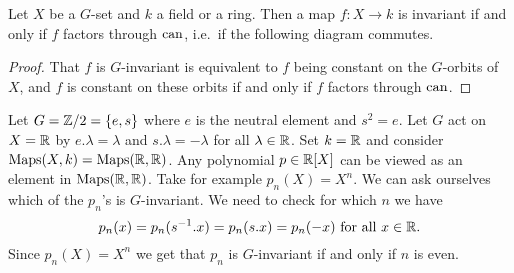 \begin{lem}
 Let $X$ be a $G$-set and $k$ a field or a ring. Then a map $f \colon X \to k$ is invariant if and only if $f$ factors through $\operatorname{can}$, i.e.\ if the following diagram commutes.
 \begin{center}
 \end{center}
\end{lem}
\begin{proof}
 That $f$ is $G$-invariant is equivalent to $f$ being constant on the $G$-orbits of $X$, and $f$ is constant on these orbits if and only if $f$ factors through $\operatorname{can}$.
\end{proof}


\begin{expl}
 Let $G = \mathbb{Z}/2 = \{e,s\}$ where $e$ is the neutral element and $s^2 = e$. Let $G$ act on $X = \mathbb{R}$ by $e.\lambda = \lambda$ and $s.\lambda = -\lambda$ for all $\lambda \in \mathbb{R}$. Set $k = \mathbb{R}$ and consider $\operatorname{Maps}(X,k) = \operatorname{Maps}(\mathbb{R},\mathbb{R})$. Any polynomial $p \in \mathbb{R}[X]$ can be viewed as an element in $\operatorname{Maps}(\mathbb{R},\mathbb{R})$. Take for example $p_n(X) = X^n$. We can ask ourselves which of the $p_n$’s is $G$-invariant. We need to check for which $n$ we have
 \[
  p_n(x) = p_n(s^{-1}.x) = p_n(s.x) = p_n(-x) \text{ for all } x \in \mathbb{R}.
 \]
 Since $p_n(X) = X^n$ we get that $p_n$ is $G$-invariant if and only if $n$ is even.
\end{expl}


